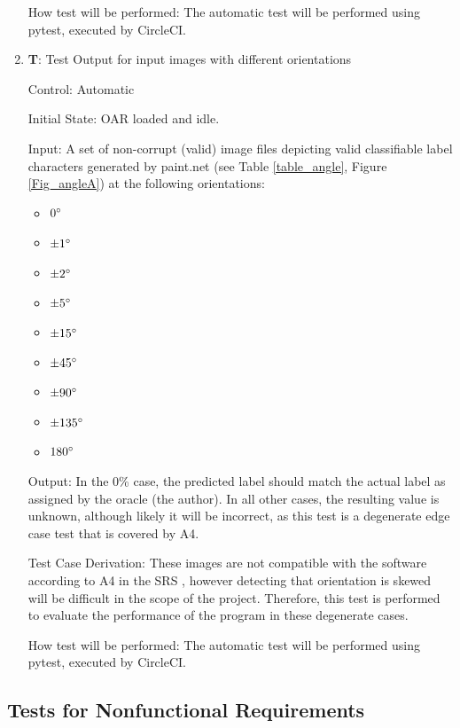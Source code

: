 \documentclass[12pt, titlepage]{article}
\newcounter{testnum} %
\begin{document}
\begin{enumerate}
  How test will be performed: The automatic test will be performed using pytest, executed by CircleCI.

  \item{\textbf{T\thetestnum \label{T_inputAngle}}: Test Output for input images with different orientations\\}
              
    Control: Automatic
              
    Initial State: OAR loaded and idle.
              
    Input: A set of non-corrupt (valid) image files depicting valid classifiable label characters generated by paint.net (see Table \ref{table_angle}, Figure \ref{Fig_angleA}) at the following orientations:
    \begin{itemize}
      \item{$0\degree$}
      \item{$\pm 1\degree$}
      \item{$\pm 2\degree$}
      \item{$\pm 5\degree$}
      \item{$\pm 15\degree$}
      \item{$\pm 45\degree$}
      \item{$\pm 90\degree$}
      \item{$\pm 135\degree$}
      \item{$180\degree$}
    \end{itemize}
              
    Output: In the 0\% case, the predicted label should match the actual label as assigned by the oracle (the author). In all other cases,
    the resulting value is unknown, although likely it will be incorrect, as this test is a degenerate edge case test that is covered by A4.
              
    Test Case Derivation: These images are not compatible with the software according to A4 in the SRS \citep{SRS}, however detecting that orientation is
    skewed will be difficult in the scope of the project. Therefore, this test is performed to evaluate the performance of the program in 
    these degenerate cases.
              
    How test will be performed: The automatic test will be performed using pytest, executed by CircleCI.
\end{enumerate}






\subsection{Tests for Nonfunctional Requirements}
\end{document}
